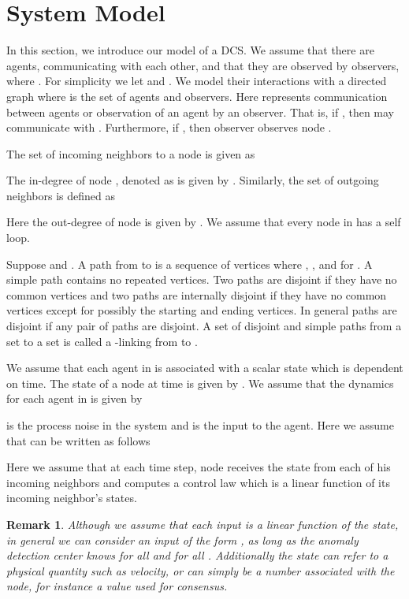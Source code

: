 \documentclass[letterpaper, 10 pt, conference]{ieeeconf}
\newtheorem{remark}[theorem]{Remark}
\begin{document}
\section{System Model}
In this section, we introduce our model of a DCS. We assume that there are  agents,  communicating with each other, and that they are observed by  observers,  where . For simplicity we let  and . We model their interactions with a directed graph  where  is the set of agents and observers. Here  represents communication between agents or observation of an agent by an observer. That is, if , then  may communicate with . Furthermore, if , then observer  observes node . 


The set of incoming neighbors to a node  is given as 

The in-degree of node , denoted as  is given by . Similarly, the set of outgoing neighbors is defined as

Here the out-degree  of node  is given by . We assume that every node in  has a self loop.

Suppose  and . A path from  to  is a sequence of vertices  where , , and  for . A simple path contains no repeated vertices. Two paths are disjoint if they have no common vertices and two paths are internally disjoint if they have no common vertices except for possibly the starting and ending vertices. In general  paths are disjoint if any pair of paths are disjoint. A set of  disjoint and simple paths from a set  to a set  is called a -linking from  to .

We assume that each agent in  is associated with a scalar state which is dependent on time. The state of a node  at time  is given by . We assume that the dynamics for each agent  in  is given by

 is the process noise in the system and  is the input to the agent. Here we assume that  can be written as follows

Here we assume that at each time step, node  receives the state from each of his incoming neighbors and computes a control law which is a linear function of its incoming neighbor's states. 
\begin{remark}
Although we assume that each input is a linear function of the state, in general we can consider an input of the form , as long as the anomaly detection center knows  for all  and for all . Additionally the state  can refer to a physical quantity such as velocity, or can simply be a number associated with the node, for instance a value used for consensus.
\end{remark}
\end{document}
